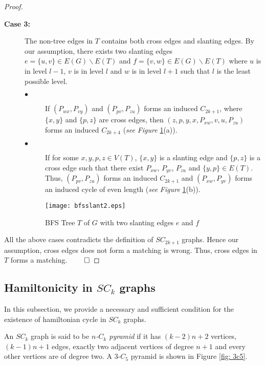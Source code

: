 \documentclass[runningheads]{llncs}
\begin{document}
\begin{proof}
\begin{description}
\begin{description}
\end{description}

\item[\textbf{Case 3:}] The non-tree edges in $T$ contains both cross edges and slanting edges. By our assumption, there exists two slanting edges $e =\{u,v\} \in E(G)\backslash E(T)$  and $f = \{v,w\} \in E(G)\backslash E(T)$ where $u$ is in level $l-1$, $v$ is in level $l$ and $w$ is in level $l+1$ such that $l$ is the least possible level. 

\begin{description}
\item[$\bullet$] If $(P_{wx},P_{vy})$ and $(P_{pv},P_{zu})$ forms an induced $C_{2k+1}$, where $\{x,y\}$ and $\{p,z\}$ are cross edges, then $(z,p,y,x,P_{xw},v,u,P_{zu})$ forms an induced $C_{2k+4}$ 
(\emph{see} \emph{Figure }\ref{fig:bfs3}(a)).    

\item[$\bullet$] If for some $x,y,p,z \in V(T)$, $\{x,y\}$ is a slanting edge and $\{p,z\}$ is a cross edge such that there exist $P_{xw}$, $P_{yv}$, $P_{zu}$ and $\{y,p\}\in E(T)$. Thus, $(P_{pv},P_{zu})$ forms an induced $C_{2k+1}$ and $(P_{xw}, P_{yv})$ forms an induced cycle of even length 
(\emph{see} \emph{Figure }\ref{fig:bfs3}(b)).    
\end{description}

\begin{figure}[h]
\begin{center}
\texttt{[image: bfsslant2.eps]}
\caption{BFS Tree $T$ of $G$ with two slanting edges $e$ and $f$}
\label{fig:bfs3}
\end{center}
\end{figure}

\end{description}
All the above cases contradicts the definition of $SC_{2k+1}$ graphs. Hence our assumption, cross edges does not form a matching is wrong. Thus, cross edges in $T$ forms a matching. 
$\hfill \qed$
\end{proof}




\subsection{Hamiltonicity in $SC_k$ graphs}

In this subsection, we provide a necessary and sufficient condition for the existence of hamiltonian cycle in $SC_k$ graphs.


\begin{definition}
 An $SC_k$ graph is said to be \emph{$n$-$C_k$ pyramid} if it has $(k-2)n+2$ vertices, $(k-1)n+1$ edges, exactly two adjacent vertices of degree $n+1$ and every other vertices are of degree two. A 3-$C_5$ pyramid is shown in Figure  \ref{fig: 3c5}.
\end{definition}
\end{document}
